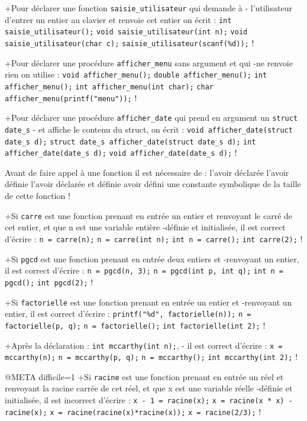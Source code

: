 +Pour déclarer une fonction \verb|saisie_utilisateur| qui demande à
- l'utilisateur d'entrer un entier au clavier et renvoie cet entier on écrit :
 \verb|int saisie_utilisateur();|
 \verb|void saisie_utilisateur(int n);|
 \verb|void saisie_utilisateur(char c);|
 \verb|saisie_utilisateur(scanf(%d));|
!


+Pour déclarer une procédure \verb|afficher_menu| sans argument et qui
-ne renvoie rien on utilise :
 \verb|void afficher_menu();|
 \verb|double afficher_menu();|
 \verb|int afficher_menu();|
 \verb|int afficher_menu(int char);|
 \verb|char afficher_menu(printf("menu"));|
!


+Pour déclarer une procédure \verb|afficher_date| qui prend en argument un
\verb|struct date_s|
- et affiche le contenu du struct, on écrit :
 \verb|void afficher_date(struct date_s d);|
 \verb|struct date_s afficher_date(struct date_s d);|
 \verb|int afficher_date(date_s d);|
 \verb|void afficher_date(date_s d);|
!

Avant de faire appel à une fonction il est nécessaire de :
 l'avoir déclarée
 l'avoir définie
 l'avoir déclarée et définie
 avoir défini une constante symbolique de la taille de cette fonction
!

+Si \verb|carre| est une fonction prenant en entrée un entier et
renvoyant le carré de cet entier, et que n est une variable entière
-définie et initialisée, il est correct d'écrire :
 \verb+n = carre(n);+
 \verb+n = carre(int n);+
 \verb+int n = carre();+
 \verb+int carre(2);+
!

+Si \verb|pgcd| est une fonction prenant en entrée deux entiers et
-renvoyant un entier, il est correct d'écrire :
 \verb+n = pgcd(n, 3);+
 \verb+n = pgcd(int p, int q);+
 \verb+int n = pgcd();+
 \verb+int pgcd(2);+
!

+Si \verb|factorielle| est une fonction prenant en entrée un entier et
-renvoyant un entier, il est correct d'écrire :
 \verb+printf("%d", factorielle(n));+
 \verb+n = factorielle(p, q);+
 \verb+n = factorielle();+
 \verb+int factorielle(int 2);+
!

+Après la déclaration :
\verb|int mccarthy(int n);|, 
- il est correct d'écrire :
 \verb+x = mccarthy(n);+
 \verb+n = mccarthy(p, q);+
 \verb+n = mccarthy();+
 \verb+int mccarthy(int 2);+
!

@META difficile=1
+Si \verb|racine| est une fonction prenant en entrée un réel et
 renvoyant la racine carrée de cet réel, et que x est une variable réelle
-définie et initialisée, il est incorrect d'écrire :
 \verb+x - 1 = racine(x);+
 \verb+x = racine(x * x) - racine(x);+
 \verb+x = racine(racine(x)*racine(x));+
 \verb+x = racine(2/3);+
!


